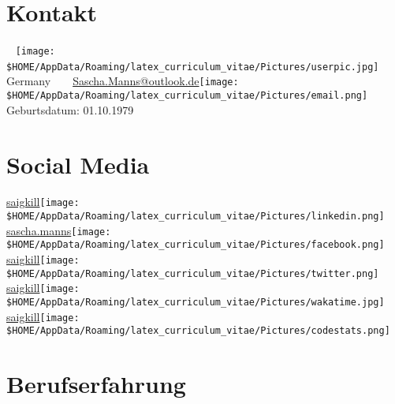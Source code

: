 \documentclass[a4paper]{friggeri-cv} %
\begin{document}


\begin{aside} %
\section{Kontakt}
~
\texttt{[image: \$HOME/AppData/Roaming/latex\_curriculum\_vitae/Pictures/userpic.jpg]}
~
\mystreet
\mycity
Germany
~
\myphone
~
\href{mailto:Sascha.Manns@outlook.de}{Sascha.Manns@outlook.de}\texttt{[image: \$HOME/AppData/Roaming/latex\_curriculum\_vitae/Pictures/email.png]}
Geburtsdatum: 01.10.1979
\section{Social Media}
\href{https://www.linkedin.com/in/saigkill}{saigkill}\texttt{[image: \$HOME/AppData/Roaming/latex\_curriculum\_vitae/Pictures/linkedin.png]}
\href{https://www.facebook.com/sascha.manns}{sascha.manns}\texttt{[image: \$HOME/AppData/Roaming/latex\_curriculum\_vitae/Pictures/facebook.png]}
\href{https://twitter.com/saigkill}{saigkill}\texttt{[image: \$HOME/AppData/Roaming/latex\_curriculum\_vitae/Pictures/twitter.png]}
\href{https://wakatime.com/@saigkill}{saigkill}\texttt{[image: \$HOME/AppData/Roaming/latex\_curriculum\_vitae/Pictures/wakatime.jpg]}
\href{https://codestats.net/users/saigkill}{saigkill}\texttt{[image: \$HOME/AppData/Roaming/latex\_curriculum\_vitae/Pictures/codestats.png]}
\end{aside}


\section{Berufserfahrung}
\end{document}

